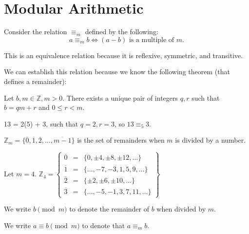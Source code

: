 
\section{Modular Arithmetic}

Consider the relation \( \equiv_m \) defined by the following: \[
	a \equiv_m b \iff (a - b) \text{ is a multiple of } m
.\] 

\begin{note}
	This is an equivalence relation because it is reflexive, symmetric, and transitive.
\end{note}

We can establish this relation because we know the following theorem (that defines a remainder):

\begin{theorem}
	Let \( b,m \in \mathbb{Z},m>0 \). There exists a unique pair of integers \( q,r \) such that \( b = qm + r \) and \( 0 \le r < m \).
\end{theorem}

\begin{eg}
	13 = 2(5) + 3, such that \( q=2,r=3 \), so \( 13 \equiv_5 3 \). 
\end{eg}

\begin{definition}
	\( \mathbb{Z}_m = \{\overline{0}   ,\overline{1} ,\overline{2} ,\ldots ,\overline{m-1} \}  \) is the set of remainders when \( m \) is divided by a number.
\end{definition}

\begin{eg}
	Let \( m=4 \). \( \mathbb{Z}_4 = \begin{Bmatrix} \overline{0}&=&\{0,\pm 4,\pm 8,\pm 12,\ldots \} \\ \overline{1}&=&\{\ldots ,-7,-3, 1,5,9,\ldots \} \\ \overline{2}&=&\{\pm 2, \pm 6, \pm 10, \ldots \} \\ \overline{3}&=&\{\ldots ,-5,-1,3,7,11,\ldots \}           \end{Bmatrix}   \) 
\end{eg}

\begin{notation}
	We write \( b \pmod m \) to denote the remainder of \( b \) when divided by \( m \).
\end{notation}

\begin{notation}
	We write \( a \equiv b \pmod m \) to denote that \( a \equiv_m b \).
\end{notation}


